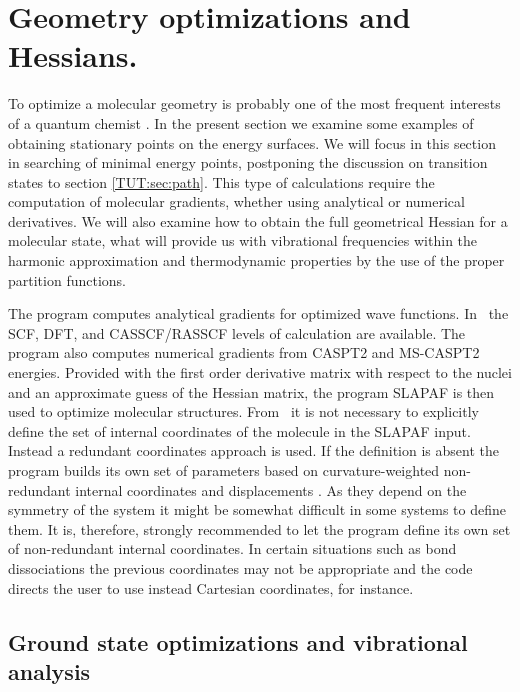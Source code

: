 \section{Geometry optimizations and Hessians.}
\label{TUT:sec:optim}
To optimize a molecular geometry is probably one of the most frequent
interests of a quantum chemist \cite{Helgaker:92}. In the present section we examine  
some examples of obtaining stationary points on the energy surfaces.
We will focus in this section in searching of minimal energy points,
postponing the discussion on transition states to section \ref{TUT:sec:path}.
This type of calculations require the computation of molecular gradients,
whether using analytical or numerical derivatives. We will also examine
how to obtain the full geometrical Hessian for a molecular state, what
will provide us with vibrational frequencies within the harmonic 
approximation and thermodynamic properties by the use of the proper
partition functions.

The program  computes analytical gradients for optimized wave
functions. In \molcasversion\ the SCF, DFT, and CASSCF/RASSCF levels of calculation are
available. The program  also computes numerical gradients
from CASPT2 and MS-CASPT2 energies. Provided with the first order derivative matrix with respect to the
nuclei and an approximate guess of the Hessian matrix, the program
SLAPAF is then used to optimize molecular structures. From \molcasv\ it is
not necessary to explicitly define the set of internal coordinates
of the molecule in the SLAPAF input. Instead a redundant coordinates
approach is used. If the definition is absent
the program builds its own set of parameters based on 
curvature-weighted non-redundant internal coordinates and displacements
\cite{Lindh:97}. As they depend
on the symmetry of the system it might be somewhat difficult in some
systems to define them. It is, therefore, strongly recommended to let
the program define its own set of non-redundant internal coordinates.
In certain situations such as bond dissociations the previous coordinates
may not be appropriate and the code directs the user to use instead
Cartesian coordinates, for instance.

\subsection{Ground state optimizations and vibrational analysis}

